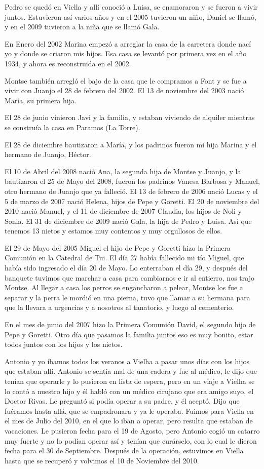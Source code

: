 \documentclass[12pt,a5paper]{book}
\begin{document}
Pedro se quedó en Viella y allí conoció a Luisa, se enamoraron y se fueron a vivir juntos. Estuvieron así varios años y en el 2005 tuvieron un niño, Daniel se llamó, y en el 2009 tuvieron a la niña que se llamó Gala.

En Enero del 2002 Marina empezó a arreglar la casa de la carretera donde nací yo y donde se criaron mis hijos. Esa casa se levantó por primera vez en el año 1934, y ahora es reconstruida en el 2002.

Montse también arregló el bajo de la casa que le compramos a Font y se fue a vivir con Juanjo el 28 de febrero del 2002. El 13 de noviembre del 2003 nació María, su primera hija.

El 28 de junio vinieron Javi y la familia, y estaban viviendo de alquiler mientras se construía la casa en Paramos (La Torre).

El 28 de diciembre bautizaron a María, y los padrinos fueron mi hija Marina y el hermano de Juanjo, Héctor.

El 10 de Abril del 2008 nació Ana, la segunda hija de Montse y Juanjo, y la bautizaron el 25 de Mayo del 2008, fueron los padrinos Vanesa Barbosa y Manuel, otro hermano de Juanjo que ya falleció. El 13 de febrero de 2006 nació Lucas y el 5 de marzo de 2007 nació Helena, hijos de Pepe y Goretti. El 20 de noviembre del 2010 nació Manuel, y el 11 de diciembre de 2007 Claudia, los hijos de Noli y Sonia. El 31 de diciembre de 2009 nació Gala, la hija de Pedro y Luisa. Así que tenemos 13 nietos y estamos muy contentos y muy orgullosos de ellos.

El 29 de Mayo del 2005 Miguel el hijo de Pepe y Goretti hizo la Primera Comunión en la Catedral de Tui. El día 27 había fallecido mi tío Miguel, que había sido ingresado el día 20 de Mayo. Lo enterraban el día 29, y después del banquete tuvimos que marchar a casa para cambiarnos e ir al entierro, nos trajo Montse. Al llegar a casa los perros se engancharon a pelear, Montse los fue a separar y la perra le mordió en una pierna, tuvo que llamar a su hermana para que la llevara a urgencias y a nosotros al tanatorio, y luego al cementerio.

En el mes de junio del 2007 hizo la Primera Comunión David, el segundo hijo de Pepe y Goretti. Otro día que pasamos la familia juntos eso es muy bonito, estar todos juntos con los hijos y los nietos.

Antonio y yo íbamos todos los veranos a Vielha a pasar unos días con los hijos que estaban allí. Antonio se sentía mal de una cadera y fue al médico, le dijo que tenían que operarle y lo pusieron en lista de espera, pero en un viaje a Vielha se lo contó a nuestro hijo y él habló con un médico cirujano que era amigo suyo, el Doctor Rivas. Le preguntó si podía operar a su padre, y él aceptó. Dijo que fuéramos hasta allá, que se empadronara y ya le operaba. Fuimos para Viella en el mes de Julio del 2010, en el que lo iban a operar, pero resulta que estaban de vacaciones. Le pusieron fecha para el 19 de Agosto, pero Antonio cogió un catarro muy fuerte y no lo podían operar así y tenían que curárselo, con lo cual le dieron fecha para el 30 de Septiembre. Después de la operación, estuvimos en Viella hasta que se recuperó y volvimos el 10 de Noviembre del 2010.
\end{document}
